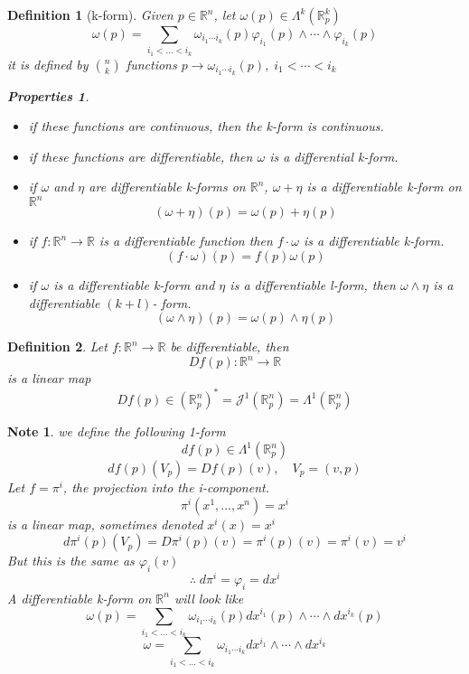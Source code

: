 \documentclass[12pt]{article}
\def\maj{\mathcal{J}}
\def\RR{\mathbb{R}}
\newtheorem{definition}{Definition}[section]
\newtheorem*{note}{Note}
\newtheorem*{properties}{Properties}
\begin{document}
\begin{definition}[k-form]
Given $p \in \RR^n$, let $\omega(p)\in \Lambda^k(\RR_p^k) $
\[\omega(p) = \sum\limits_{i_1<\dots< i_k}\omega_{i_1\cdots i_k}(p)\varphi_{i_1}(p)\wedge\cdots\wedge\varphi_{i_k}(p)\]
it is defined by ${n \choose k}$ functions $p \rightarrow \omega_{i_1\cdots i_k}(p), \; i_1<\cdots <i_k$
\begin{properties}\quad \\
\begin{itemize}
\item if these functions are continuous, then the k-form is continuous. 
\item if these functions are differentiable, then $\omega$ is a differential k-form.
\item if $\omega$ and $\eta$ are differentiable k-forms on $\RR^n$, $\omega + \eta$ is a differentiable k-form on $\RR^n$
\[(\omega + \eta)(p) = \omega(p) + \eta(p)\]
\item if $f:\RR^n \rightarrow \RR$ is a differentiable function then $f\cdot\omega$ is a differentiable k-form.
\[(f\cdot\omega)(p) = f(p)\omega(p)\]
\item if $\omega$ is a differentiable k-form and $\eta$ is a differentiable l-form, then $\omega\wedge\eta$ is a differentiable $(k+l)$- form. 
\[(\omega\wedge\eta)(p) = \omega(p)\wedge\eta(p)\]
\end{itemize}
\end{properties}
\end{definition}

\begin{definition}
Let $f:\RR^n \rightarrow \RR$ be differentiable, then 
\[Df(p):\RR^n \rightarrow \RR\]
is a linear map
\[Df(p) \in (\RR_p^n)^*  = \maj^1(\RR_p^n) = \Lambda^1(\RR_p^n)\]
\end{definition}

\begin{note}
we define the following 1-form
\[df(p) \in \Lambda^1(\RR_p^n)\]
\[df(p)(V_p) = Df(p)(v), \quad V_p= (v,p)\]
Let $f=\pi^i$, the projection into the i-component.
\[\pi^i(x^1, \dots, x^n) = x^i \]
is a linear map, sometimes denoted $x^i(x) = x^i$
\[d\pi^i(p)(V_p) = D\pi^i(p)(v) =\pi^i(p)(v) = \pi^i(v) = v^i\]
But this is the same as $\varphi_i(v)$
\[\therefore \; d\pi^i = \varphi_i = dx^i\]
A differentiable k-form on $\RR^n$ will look like 
\[\omega(p) = \sum\limits_{i_1<\dots< i_k}\omega_{i_1\cdots i_k}(p)dx^{i_1}(p)\wedge\cdots\wedge dx^{i_k}(p)\]
\[\omega = \sum\limits_{i_1<\dots< i_k}\omega_{i_1\cdots i_k}dx^{i_1}\wedge\cdots\wedge dx^{i_k}\]
\end{note}
\end{document}
